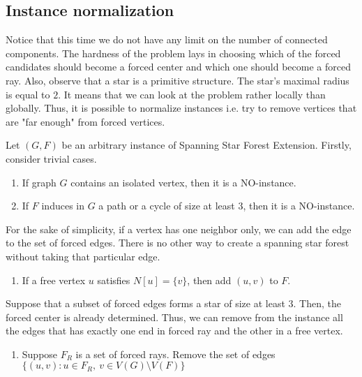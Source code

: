 \documentclass[en]{pracamgr}
\newcommand{\ssfep}{{\sc Spanning Star Forest Extension}}
\begin{document}
\subsection{Instance normalization} 

Notice that this time we do not have any limit on the number of connected components. The hardness of the problem lays in choosing which of the forced candidates should become a forced center and which one should become a forced ray. Also, observe that a star is a primitive structure. The star's maximal radius is equal to $2$. It means that we can look at the problem rather locally than globally. Thus, it is possible to normalize instances i.e. try to remove vertices that are "far enough" from forced vertices.

Let $(G, F)$ be an arbitrary instance of \ssfep{}. Firstly, consider trivial cases.

\begin{enumerate}[leftmargin=*,label=\textbf{Reduction \arabic{enumi}},labelindent=0pt]
	\item If graph $G$ contains an isolated vertex, then it is a NO-instance.
	\item If $F$ induces in $G$ a path or a cycle of size at least $3$, then it is a NO-instance.
\end{enumerate}

For the sake of simplicity, if a vertex has one neighbor only, we can add the edge to the set of forced edges. There is no other way to create a spanning star forest without taking that particular edge.

\begin{enumerate}[leftmargin=*,label=\textbf{Reduction \arabic{enumi}},resume]
	\item If a free vertex $u$ satisfies $N[u] = \{v\}$, then add $(u,v)$ to $F$.
\end{enumerate}

Suppose that a subset of forced edges forms a star of size at least $3$. Then, the forced center is already determined. Thus, we can remove from the instance all the edges that has exactly one end in forced ray and the other in a free vertex. 

\begin{enumerate}[leftmargin=*,label=\textbf{Reduction \arabic{enumi}},resume,wide, labelwidth=!, labelindent=0pt]
	\item Suppose $F_R$ is a set of forced rays. Remove the set of edges $\{(u,v): u \in F_R,\ v \in V(G) \setminus V(F)\}$
\end{enumerate}
\end{document}
